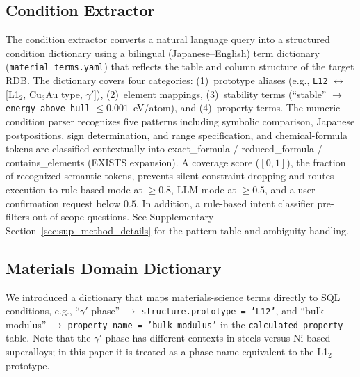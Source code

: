 \subsection{Condition Extractor}
\label{sec:entity_extractor}
\label{sec:coverage_score}
\label{sec:intent_classifier}

The condition extractor converts a natural language query into a structured condition dictionary using a bilingual (Japanese--English) term dictionary (\texttt{material\_terms.yaml}) that reflects the table and column structure of the target RDB. The dictionary covers four categories: (1)~prototype aliases (e.g., \texttt{L12} $\leftrightarrow$ [L1$_2$, Cu$_3$Au type, $\gamma'$]), (2)~element mappings, (3)~stability terms (``stable'' $\to$ \texttt{energy\_above\_hull} $\leq 0.001$~eV/atom), and (4)~property terms. The numeric-condition parser recognizes five patterns including symbolic comparison, Japanese postpositions, sign determination, and range specification, and chemical-formula tokens are classified contextually into exact\_formula / reduced\_formula / contains\_elements (EXISTS expansion). A coverage score ($[0,1]$), the fraction of recognized semantic tokens, prevents silent constraint dropping and routes execution to rule-based mode at $\geq 0.8$, LLM mode at $\geq 0.5$, and a user-confirmation request below $0.5$. In addition, a rule-based intent classifier pre-filters out-of-scope questions. See Supplementary Section~\ref{sec:sup_method_details} for the pattern table and ambiguity handling.

\subsection{Materials Domain Dictionary}
\label{sec:domain_dict}

We introduced a dictionary that maps materials-science terms directly to SQL conditions, e.g., ``$\gamma'$ phase'' $\to$ \texttt{structure.prototype = 'L12'}, and ``bulk modulus'' $\to$ \texttt{property\_name = 'bulk\_modulus'} in the \texttt{calculated\_property} table. Note that the $\gamma'$ phase has different contexts in steels versus Ni-based superalloys; in this paper it is treated as a phase name equivalent to the L1$_2$ prototype.

